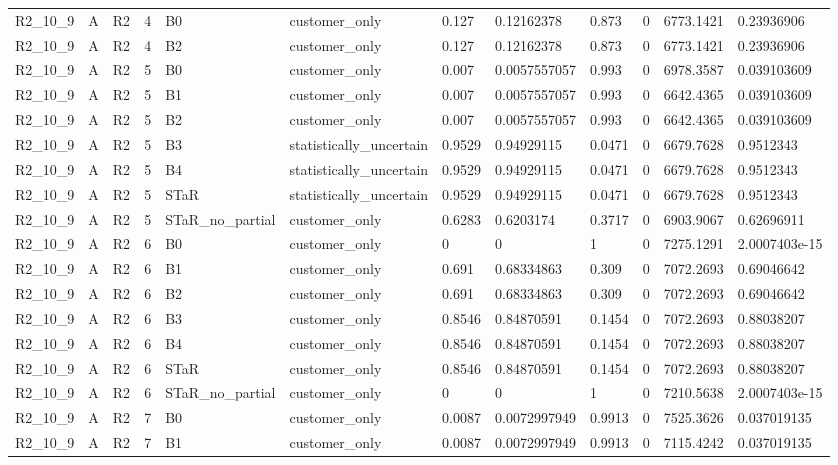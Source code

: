 \begin{longtable}{llllllllllll}
R2\_10\_9 & A & R2 & 4 & B0 & customer\_only & 0.127 & 0.12162378 & 0.873 & 0 & 6773.1421 & 0.23936906 \\
R2\_10\_9 & A & R2 & 4 & B2 & customer\_only & 0.127 & 0.12162378 & 0.873 & 0 & 6773.1421 & 0.23936906 \\
R2\_10\_9 & A & R2 & 5 & B0 & customer\_only & 0.007 & 0.0057557057 & 0.993 & 0 & 6978.3587 & 0.039103609 \\
R2\_10\_9 & A & R2 & 5 & B1 & customer\_only & 0.007 & 0.0057557057 & 0.993 & 0 & 6642.4365 & 0.039103609 \\
R2\_10\_9 & A & R2 & 5 & B2 & customer\_only & 0.007 & 0.0057557057 & 0.993 & 0 & 6642.4365 & 0.039103609 \\
R2\_10\_9 & A & R2 & 5 & B3 & statistically\_uncertain & 0.9529 & 0.94929115 & 0.0471 & 0 & 6679.7628 & 0.9512343 \\
R2\_10\_9 & A & R2 & 5 & B4 & statistically\_uncertain & 0.9529 & 0.94929115 & 0.0471 & 0 & 6679.7628 & 0.9512343 \\
R2\_10\_9 & A & R2 & 5 & STaR & statistically\_uncertain & 0.9529 & 0.94929115 & 0.0471 & 0 & 6679.7628 & 0.9512343 \\
R2\_10\_9 & A & R2 & 5 & STaR\_no\_partial & customer\_only & 0.6283 & 0.6203174 & 0.3717 & 0 & 6903.9067 & 0.62696911 \\
R2\_10\_9 & A & R2 & 6 & B0 & customer\_only & 0 & 0 & 1 & 0 & 7275.1291 & 2.0007403e-15 \\
R2\_10\_9 & A & R2 & 6 & B1 & customer\_only & 0.691 & 0.68334863 & 0.309 & 0 & 7072.2693 & 0.69046642 \\
R2\_10\_9 & A & R2 & 6 & B2 & customer\_only & 0.691 & 0.68334863 & 0.309 & 0 & 7072.2693 & 0.69046642 \\
R2\_10\_9 & A & R2 & 6 & B3 & customer\_only & 0.8546 & 0.84870591 & 0.1454 & 0 & 7072.2693 & 0.88038207 \\
R2\_10\_9 & A & R2 & 6 & B4 & customer\_only & 0.8546 & 0.84870591 & 0.1454 & 0 & 7072.2693 & 0.88038207 \\
R2\_10\_9 & A & R2 & 6 & STaR & customer\_only & 0.8546 & 0.84870591 & 0.1454 & 0 & 7072.2693 & 0.88038207 \\
R2\_10\_9 & A & R2 & 6 & STaR\_no\_partial & customer\_only & 0 & 0 & 1 & 0 & 7210.5638 & 2.0007403e-15 \\
R2\_10\_9 & A & R2 & 7 & B0 & customer\_only & 0.0087 & 0.0072997949 & 0.9913 & 0 & 7525.3626 & 0.037019135 \\
R2\_10\_9 & A & R2 & 7 & B1 & customer\_only & 0.0087 & 0.0072997949 & 0.9913 & 0 & 7115.4242 & 0.037019135 \\

\end{longtable}
